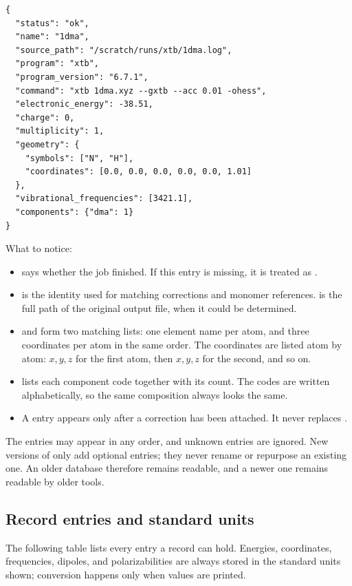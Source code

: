 \begin{verbatim}
{
  "status": "ok",
  "name": "1dma",
  "source_path": "/scratch/runs/xtb/1dma.log",
  "program": "xtb",
  "program_version": "6.7.1",
  "command": "xtb 1dma.xyz --gxtb --acc 0.01 -ohess",
  "electronic_energy": -38.51,
  "charge": 0,
  "multiplicity": 1,
  "geometry": {
    "symbols": ["N", "H"],
    "coordinates": [0.0, 0.0, 0.0, 0.0, 0.0, 1.01]
  },
  "vibrational_frequencies": [3421.1],
  "components": {"dma": 1}
}
\end{verbatim}

What to notice:

\begin{itemize}
  \item {} says whether the job finished. If this entry is missing,
        it is treated as .
  \item {} is the identity used for matching corrections and monomer
        references.  is the full path of the original output
        file, when it could be determined.
  \item {} and  form two
        matching lists: one element name per atom, and three coordinates per
        atom in the same order. The coordinates are listed atom by atom: $x,y,z$
        for the first atom, then $x,y,z$ for the second, and so on.
  \item {} lists each component code together with its count.
        The codes are written alphabetically, so the same composition always
        looks the same.
  \item A  entry appears only after a correction has been
        attached. It never replaces .
\end{itemize}

The entries may appear in any order, and unknown entries are ignored. New
versions of \CJKQC{} only add optional entries; they never rename or
repurpose an existing one. An older database therefore remains readable, and
a newer one remains readable by older tools.

\subsection{Record entries and standard units}\label{sec:fields}

The following table lists every entry a record can hold. Energies,
coordinates, frequencies, dipoles, and polarizabilities are always stored in
the standard units shown; conversion happens only when values are printed.

